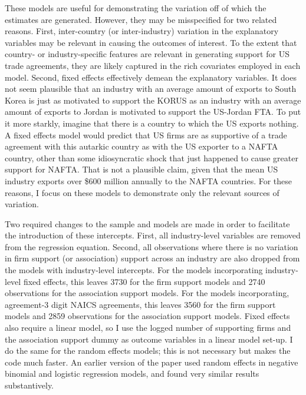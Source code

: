 \documentclass[hidelinks,12pt,letter]{article}
\begin{document}
These models are useful for demonstrating the variation off of which the estimates are generated. However, they may be misspecified for two related reasons. First, inter-country (or inter-industry) variation in the explanatory variables may be relevant in causing the outcomes of interest. To the extent that country- or industry-specific features are relevant in generating support for US trade agreements, they are likely captured in the rich covariates employed in each model. Second, fixed effects effectively demean the explanatory variables. It does not seem plausible that an industry with an average amount of exports to South Korea is just as motivated to support the KORUS as an industry with an average amount of exports to Jordan is motivated to support the US-Jordan FTA. To put it more starkly, imagine that there is a country to which the US exports nothing. A fixed effects model would predict that US firms are as supportive of a trade agreement with this autarkic country as with the US exporter to a NAFTA country, other than some idiosyncratic shock that just happened to cause greater support for NAFTA. That is not a plausible claim, given that the mean US industry exports over \$600 million annually to the NAFTA countries. For these reasons, I focus on these models to demonstrate only the relevant sources of variation.

Two required changes to the sample and models are made in order to facilitate the introduction of these intercepts. First, all industry-level variables are removed from the regression equation. Second, all observations where there is no variation in firm support (or association) support across an industry are also dropped from the models with industry-level intercepts. For the models incorporating industry-level fixed effects, this leaves 3730 for the firm support models and 2740 observations for the association support models. For the models incorporating, agreement-3 digit NAICS agreements, this leaves 3560 for the firm support models and 2859 observations for the association support models. Fixed effects also require a linear model, so I use the logged number of supporting firms and the association support dummy as outcome variables in a linear model set-up. I do the same for the random effects models; this is not necessary but makes the code much faster. An earlier version of the paper used random effects in negative binomial and logistic regression models, and found very similar results substantively.
\end{document}
